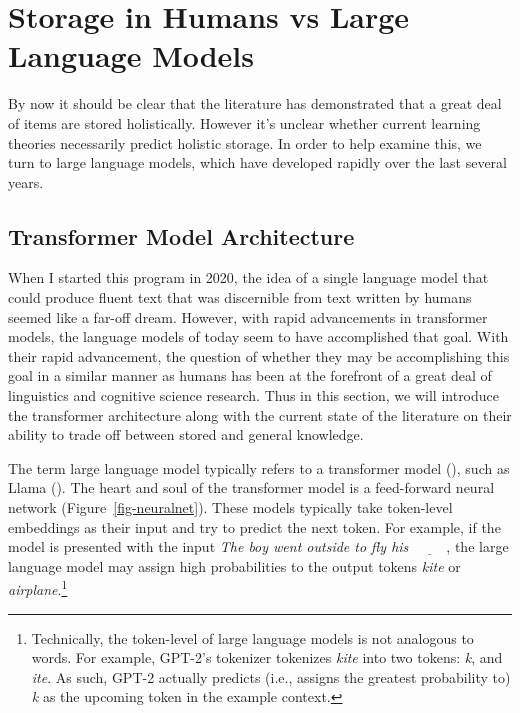 \documentclass[
  12pt,
  letterpaper,
]{scrreprt}
\begin{document}
\section{Storage in Humans vs Large Language
Models}\label{sec-storage-in-humans-vs-large-language-models}

By now it should be clear that the literature has demonstrated that a
great deal of items are stored holistically. However it's unclear
whether current learning theories necessarily predict holistic storage.
In order to help examine this, we turn to large language models, which
have developed rapidly over the last several years.

\subsection{Transformer Model
Architecture}\label{transformer-model-architecture}

When I started this program in 2020, the idea of a single language model
that could produce fluent text that was discernible from text written by
humans seemed like a far-off dream. However, with rapid advancements in
transformer models, the language models of today seem to have
accomplished that goal. With their rapid advancement, the question of
whether they may be accomplishing this goal in a similar manner as
humans has been at the forefront of a great deal of linguistics and
cognitive science research. Thus in this section, we will introduce the
transformer architecture along with the current state of the literature
on their ability to trade off between stored and general knowledge.

The term large language model typically refers to a transformer model
(), such
as Llama ().
The heart and soul of the transformer model is a feed-forward neural
network (Figure~\ref{fig-neuralnet}). These models typically take
token-level embeddings as their input and try to predict the next token.
For example, if the model is presented with the input \emph{The boy went
outside to fly his} \(\underline{\hspace{1cm}}\), the large language
model may assign high probabilities to the output tokens \emph{kite} or
\emph{airplane}.\footnote{Technically, the token-level of large language
  models is not analogous to words. For example, GPT-2's tokenizer
  tokenizes \emph{kite} into two tokens: \emph{k}, and \emph{ite}. As
  such, GPT-2 actually predicts (i.e., assigns the greatest probability
  to) \emph{k} as the upcoming token in the example context.}
\end{document}
